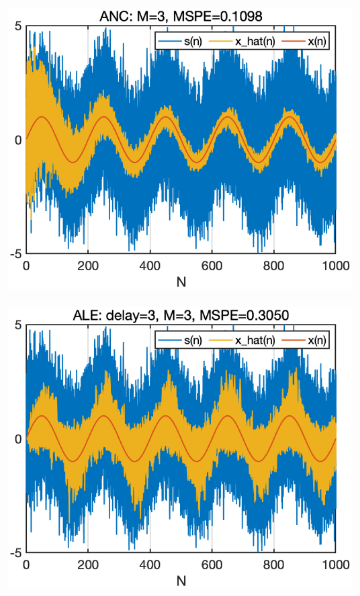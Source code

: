 \begin{figure}[htb]
    \centering
    \hspace{-0.4cm}
    \begin{subfigure}[b]{0.33\textwidth}
     \centering
     \includegraphics[width=1.1\textwidth]{fig/23/23c1.eps}
    \end{subfigure}
    \hspace{-0.1cm}
    \begin{subfigure}[b]{0.33\textwidth}
     \centering
     \includegraphics[width=1.1\textwidth]{fig/23/23c2.eps}
    \end{subfigure} 

\end{figure}
